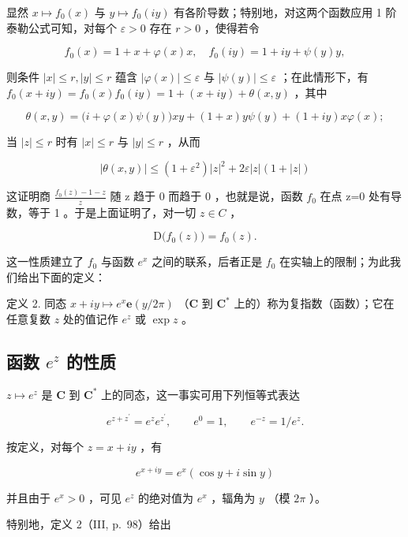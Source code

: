 显然 \(x \mapsto f_0(x)\) 与 \(y \mapsto f_0(iy)\) 有各阶导数；特别地，对这两个函数应用 1 阶泰勒公式可知，对每个 \(\varepsilon > 0\) 存在 \(r > 0\) ，使得若令

\[
f _ {0} (x) = 1 + x + \varphi (x) x, \quad f _ {0} (i y) = 1 + i y + \psi (y) y,
\]

则条件 \(|x| \leqslant r, |y| \leqslant r\) 蕴含 \(|\varphi(x)| \leqslant \varepsilon\) 与 \(|\psi(y)| \leqslant \varepsilon\) ；在此情形下，有 \(f_0(x + iy) = f_0(x)f_0(iy) = 1 + (x + iy) + \theta(x, y)\) ，其中

\[
\theta (x, y) = \bigl (i + \varphi (x) \psi (y) \bigr) x y + (1 + x) y \psi (y) + (1 + i y) x \varphi (x);
\]

当 \(|z| \leqslant r\) 时有 \(|x| \leqslant r\) 与 \(|y| \leqslant r\) ，从而

\[
\left| \theta (x, y) \right| \leqslant \left(1 + \varepsilon^ {2}\right) | z | ^ {2} + 2 \varepsilon | z | (1 + | z |)
\]

这证明商 \(\frac{f_{0}(z)-1-z}{z}\) 随 z 趋于 0 而趋于 0 ，也就是说，函数 \(f_{0}\) 在点 z=0 处有导数，等于 1 。于是上面证明了，对一切 \(z\in C\) ，

\[
\mathrm{D} \big (f _ {0} (z) \big) = f _ {0} (z).\tag{21}
\]

这一性质建立了 \(f_{0}\) 与函数 \(e^{x}\) 之间的联系，后者正是 \(f_{0}\) 在实轴上的限制；为此我们给出下面的定义：

定义 2. 同态 \(x + iy \mapsto e^x\mathbf{e}(y/2\pi)\) （\(\mathbf{C}\) 到 \(\mathbf{C}^*\) 上的）称为复指数（函数）；它在任意复数 \(z\) 处的值记作 \(e^z\) 或 \(\exp z\) 。

\subsection{\texorpdfstring{函数 \(e^{z}\) 的性质}{函数 e 的 z 次幂的性质}}

\(z \mapsto e^z\) 是 \(\mathbf{C}\) 到 \(\mathbf{C}^*\) 上的同态，这一事实可用下列恒等式表达

\[
e ^ {z + z ^ {\prime}} = e ^ {z} e ^ {z ^ {\prime}}, \qquad e ^ {0} = 1, \qquad e ^ {- z} = 1 / e ^ {z}.\tag{22}
\]

按定义，对每个 \(z = x + iy\) ，有

\[
e ^ {x + i y} = e ^ {x} (\cos y + i \sin y)\tag{23}
\]

并且由于 \(e^x > 0\) ，可见 \(e^z\) 的绝对值为 \(e^x\) ，辐角为 \(y\) （模 \(2\pi\) ）。

特别地，定义 2（III, p.~98）给出

